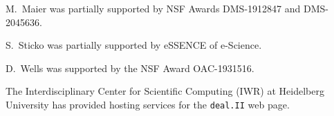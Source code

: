 \documentclass{ansarticle-preprint}
\newcommand{\specialword}[1]{\texttt{#1}}
\newcommand{\dealii}{{\specialword{deal.II}}\xspace}
\begin{document}
M.~Maier was partially supported by NSF Awards DMS-1912847 and DMS-2045636.

S.~Sticko was partially supported by eSSENCE of e-Science.

D.~Wells was supported by the NSF Award OAC-1931516.

The Interdisciplinary Center for Scientific Computing (IWR) at Heidelberg
University has provided hosting services for the \dealii web page.

{}

\end{document}
